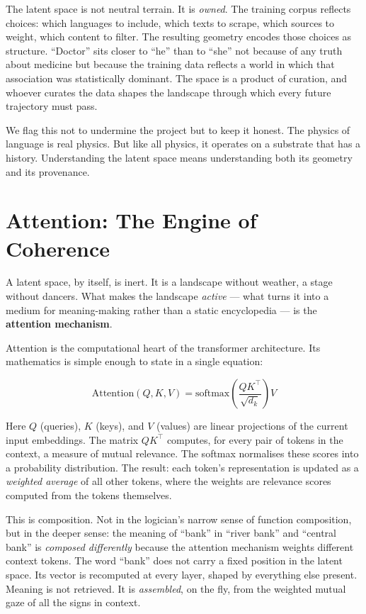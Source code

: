 \documentclass[12pt,a4paper]{article}
\begin{document}
The latent space is not neutral terrain. It is \emph{owned}. The training corpus reflects choices: which languages to include, which texts to scrape, which sources to weight, which content to filter. The resulting geometry encodes those choices as structure. ``Doctor'' sits closer to ``he'' than to ``she'' not because of any truth about medicine but because the training data reflects a world in which that association was statistically dominant. The space is a product of curation, and whoever curates the data shapes the landscape through which every future trajectory must pass.

We flag this not to undermine the project but to keep it honest. The physics of language is real physics. But like all physics, it operates on a substrate that has a history. Understanding the latent space means understanding both its geometry and its provenance.

\section{Attention: The Engine of Coherence}

A latent space, by itself, is inert. It is a landscape without weather, a stage without dancers. What makes the landscape \emph{active} --- what turns it into a medium for meaning-making rather than a static encyclopedia --- is the \textbf{attention mechanism}.

Attention is the computational heart of the transformer architecture. Its mathematics is simple enough to state in a single equation:

\begin{equation}\label{eq:attention}
\text{Attention}(Q, K, V) = \text{softmax}\!\left(\frac{QK^\top}{\sqrt{d_k}}\right) V
\end{equation}

Here $Q$ (queries), $K$ (keys), and $V$ (values) are linear projections of the current input embeddings. The matrix $QK^\top$ computes, for every pair of tokens in the context, a measure of mutual relevance. The softmax normalises these scores into a probability distribution. The result: each token's representation is updated as a \emph{weighted average} of all other tokens, where the weights are relevance scores computed from the tokens themselves.

This is composition. Not in the logician's narrow sense of function composition, but in the deeper sense: the meaning of ``bank'' in ``river bank'' and ``central bank'' is \emph{composed differently} because the attention mechanism weights different context tokens. The word ``bank'' does not carry a fixed position in the latent space. Its vector is recomputed at every layer, shaped by everything else present. Meaning is not retrieved. It is \emph{assembled}, on the fly, from the weighted mutual gaze of all the signs in context.
\end{document}
